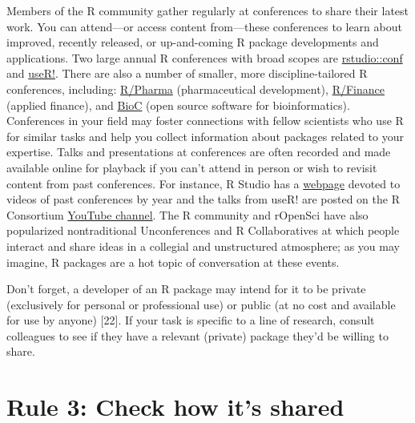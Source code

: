 \documentclass[10pt,letterpaper]{article}
\begin{document}
Members of the R community gather regularly at conferences to share
their latest work. You can attend---or access content from---these
conferences to learn about improved, recently released, or up-and-coming
R package developments and applications. Two large annual R conferences
with broad scopes are
\href{https://rstudio.com/conference/}{rstudio::conf} and
\href{https://www.r-consortium.org/}{useR!}. There are also a number of
smaller, more discipline-tailored R conferences, including:
\href{https://rinpharma.com/}{R/Pharma} (pharmaceutical development),
\href{https://www.rinfinance.com/}{R/Finance} (applied finance), and
\href{https://www.bioconductor.org/help/events/}{BioC} (open source
software for bioinformatics). Conferences in your field may foster
connections with fellow scientists who use R for similar tasks and help
you collect information about packages related to your expertise. Talks
and presentations at conferences are often recorded and made available
online for playback if you can't attend in person or wish to revisit
content from past conferences. For instance, R Studio has a
\href{https://rstudio.com/resources/rstudioconf-2020/}{webpage} devoted
to videos of past conferences by year and the talks from useR! are
posted on the R Consortium
\href{https://www.youtube.com/channel/UC_R5smHVXRYGhZYDJsnXTwg/featured}{YouTube
channel}. The R community and rOpenSci have also popularized
nontraditional Unconferences and R Collaboratives at which people
interact and share ideas in a collegial and unstructured atmosphere; as
you may imagine, R packages are a hot topic of conversation at these
events.

Don't forget, a developer of an R package may intend for it to be
private (exclusively for personal or professional use) or public (at no
cost and available for use by anyone) {[}22{]}. If your task is specific
to a line of research, consult colleagues to see if they have a relevant
(private) package they'd be willing to share.

\hypertarget{rule-3-check-how-its-shared}{%
\section{Rule 3: Check how it's
shared}\label{rule-3-check-how-its-shared}}
\end{document}
